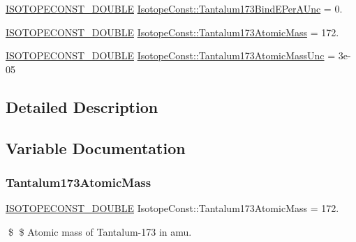 \begin{DoxyCompactItemize}
\mbox{\hyperlink{group___isotope_const-_macros_ga8f45a7272ce02c0b4c65c44636ed719a}{I\+S\+O\+T\+O\+P\+E\+C\+O\+N\+S\+T\+\_\+\+D\+O\+U\+B\+LE}} \mbox{\hyperlink{group___isotope_const-_tantalum-_ta173_ga8321f33ebb4da9c6d756adb0cd599e77}{Isotope\+Const\+::\+Tantalum173\+Bind\+E\+Per\+A\+Unc}} = 0.
\item 
\mbox{\hyperlink{group___isotope_const-_macros_ga8f45a7272ce02c0b4c65c44636ed719a}{I\+S\+O\+T\+O\+P\+E\+C\+O\+N\+S\+T\+\_\+\+D\+O\+U\+B\+LE}} \mbox{\hyperlink{group___isotope_const-_tantalum-_ta173_gaa244cd5ab2a993be33100728e9b035ce}{Isotope\+Const\+::\+Tantalum173\+Atomic\+Mass}} = 172.
\item 
\mbox{\hyperlink{group___isotope_const-_macros_ga8f45a7272ce02c0b4c65c44636ed719a}{I\+S\+O\+T\+O\+P\+E\+C\+O\+N\+S\+T\+\_\+\+D\+O\+U\+B\+LE}} \mbox{\hyperlink{group___isotope_const-_tantalum-_ta173_ga7d63693ffc1cfdac398835bc6616cd58}{Isotope\+Const\+::\+Tantalum173\+Atomic\+Mass\+Unc}} = 3e-\/05
\end{DoxyCompactItemize}


\subsection{Detailed Description}


\subsection{Variable Documentation}
\mbox{\label{group___isotope_const-_tantalum-_ta173_gaa244cd5ab2a993be33100728e9b035ce}} 
\subsubsection{\texorpdfstring{Tantalum173\+Atomic\+Mass}{Tantalum173AtomicMass}}
{\footnotesize\ttfamily \mbox{\hyperlink{group___isotope_const-_macros_ga8f45a7272ce02c0b4c65c44636ed719a}{I\+S\+O\+T\+O\+P\+E\+C\+O\+N\+S\+T\+\_\+\+D\+O\+U\+B\+LE}} Isotope\+Const\+::\+Tantalum173\+Atomic\+Mass = 172.}

\$ \$ Atomic mass of Tantalum-\/173 in amu. \mbox{\label{group___isotope_const-_tantalum-_ta173_ga7d63693ffc1cfdac398835bc6616cd58}} 
